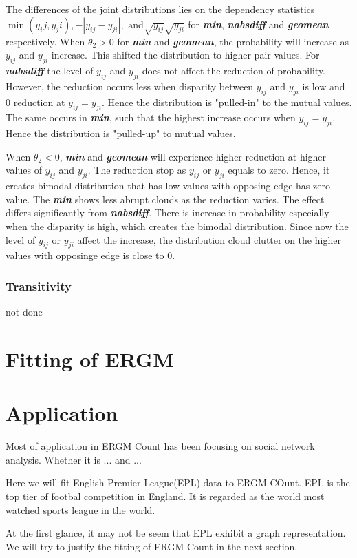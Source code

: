 \documentclass[12pt,a4paper,twoside,openany]{book}\usepackage[]{graphicx}\usepackage[]{color}
\newcommand{\BI}[1]{\textit{\textbf{#1}}}
\begin{document}
The differences of the joint distributions lies on the dependency statistics $\min(y_ij,y_ji),-|y_{ij}-y_{ji}|, \text{ and} \sqrt{y_{ij}}\sqrt{y_{ji}}$ for 
 \BI{min}, \BI{nabsdiff} and \BI{geomean} respectively.
When $\theta_2>0$ for \BI{min} and \BI{geomean}, the probability will increase as $y_{ij}$ and $y_{ji}$ increase. 
This shifted the distribution to higher pair values. 
For \BI{nabsdiff} the level of $y_{ij}$ and $y_{ji}$ does not affect the reduction of probability. 
However, the reduction occurs less when disparity between $y_{ij}$ and $y_{ji}$ is low and 0 reduction at $y_{ij}=y_{ji}$. 
Hence the distribution is "pulled-in" to the mutual values. 
The same occurs in \BI{min}, such that the highest increase occurs when $y_{ij}=y_{ji}$. 
Hence the distribution is "pulled-up" to mutual values.

When $\theta_2 <0$, \BI{min} and \BI{geomean} will experience higher reduction at higher values of $y_{ij}$ and $y_{ji}$. The reduction stop as $y_{ij}$ or $y_{ji}$ equals to zero. 
Hence, it creates bimodal distribution that has low values with opposing edge has zero value. 
The \BI{min} shows less abrupt clouds as the reduction varies. 
The effect differs significantly from \BI{nabsdiff}. 
There is increase in probability especially when the disparity is high, which creates the bimodal distribution. 
Since now the level of $y_{ij}$ or $y_{ji}$ affect the increase, the distribution cloud clutter on the higher values with opposinge edge is close to 0.

\subsection{Transitivity}
not done
\chapter{Fitting of ERGM}
 
\chapter{Application}
Most of application in ERGM Count has been focusing on social network analysis. 
Whether it is ... and ... 

Here we will fit English Premier League(EPL) data to ERGM COunt.
EPL is the top tier of footbal competition in England.
It is regarded as the world most watched sports league in the world. 

At the first glance, it may not be seem that EPL exhibit a graph representation. We will try to justify the fitting of ERGM Count in the next section.  
\end{document}
